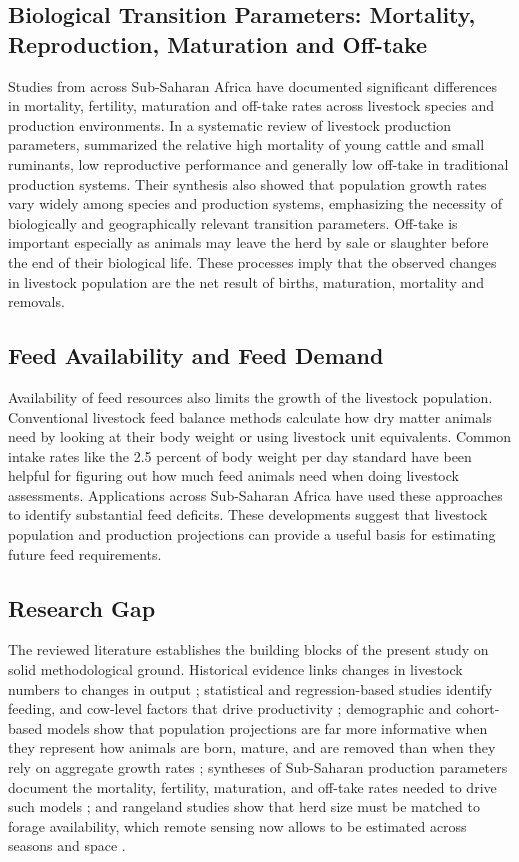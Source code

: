 \subsection{Biological Transition Parameters: Mortality, Reproduction, Maturation and Off-take}

Studies from across Sub-Saharan Africa have documented significant differences in mortality, fertility, maturation and off-take rates across livestock species and production environments. In a systematic review of livestock production parameters, \citet{otte2002} summarized the relative high mortality of young cattle and small ruminants, low reproductive performance and generally low off-take in traditional production systems. Their synthesis also showed that population growth rates vary widely among species and production systems, emphasizing the necessity of biologically and geographically relevant transition parameters. Off-take is important especially as animals may leave the herd by sale or slaughter before the end of their biological life. These processes imply that the observed changes in livestock population are the net result of births, maturation, mortality and removals. 

\subsection{Feed Availability and Feed Demand}

Availability of feed resources also limits the growth of the livestock population. Conventional livestock feed balance methods calculate how dry matter animals need by looking at their body weight or using livestock unit equivalents. Common intake rates like the 2.5 percent of body weight per day standard have been helpful for figuring out how much feed animals need when doing livestock assessments. Applications across Sub-Saharan Africa have used these approaches to identify substantial feed deficits. These developments suggest that livestock population and production projections can provide a useful basis for estimating future feed requirements. 

\subsection{Research Gap}

The reviewed literature establishes the building blocks of the present study on solid methodological ground. Historical evidence links changes in livestock numbers to changes in output \cite{africanunion2015, wanjala2014}; statistical and regression-based studies identify feeding, and cow-level factors that drive productivity \cite{ajak2020, were2025}; demographic and cohort-based models show that population projections are far more informative when they represent how animals are born, mature, and are removed than when they rely on aggregate growth rates \cite{lesnoff2012, tuffa2017}; syntheses of Sub-Saharan production parameters document the mortality, fertility, maturation, and off-take rates needed to drive such models \cite{otte2002}; and rangeland studies show that herd size must be matched to forage availability, which remote sensing now allows to be estimated across seasons and space \cite{meshesha2019}.

